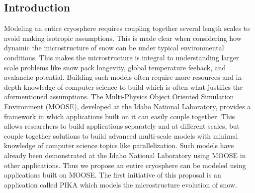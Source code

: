 \documentclass[twoside]{article}
\begin{document}
\begin{multicols}{2} %

\section{Introduction}

\lettrine[nindent=0em,lines=3]{M}odeling an entire cryosphere requires coupling together several length scales to avoid making isotropic assumptions. This is made clear when considering how dynamic the microstructure of snow can be under typical environmental conditions. This makes the microstructure is integral to understanding larger scale problems like snow pack longevity, global temperature feeback, and avalanche potential.  Building such models often require more resources and in-depth knowledge of computer science to build which is often what justifies the aformentioned assumptions. The Multi-Physics Object Oriented Simulation Environment (MOOSE), developed at the Idaho National Laboratory, provides a framework in which applications built on it can easily couple together. This allows researchers to build applications separately and at different scales, but couple together solutions to build advanced multi-scale models with minimal knowledge of computer science topics like parallelization. Such models have already been demonstrated at the Idaho National Laboratory using MOOSE in other applications. Thus we propose an entire cryosphere can be modeled using applications built on MOOSE. The first initiative of this proposal is an application called PIKA which models the microstructure evolution of snow.



\end{multicols}
\end{document}
